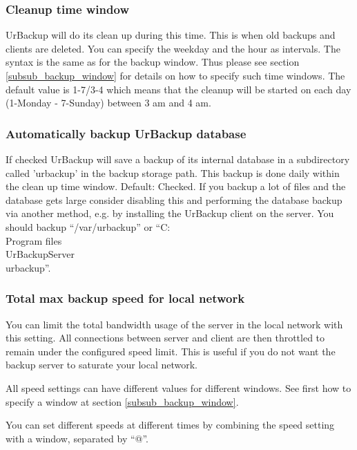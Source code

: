 \documentclass[a4paper,10pt]{article}
\begin{document}
\subsubsection{Cleanup time window}

UrBackup will do its clean up during this time. This is when old backups and
clients are deleted. You can specify the weekday and the hour as intervals. The
syntax is the same as for the backup window. Thus please see section
\ref{subsub_backup_window} for details on how to specify such time windows.
The default value is 1-7/3-4 which means that the cleanup will be started on
each day (1-Monday - 7-Sunday) between 3 am and 4 am.

\subsubsection{Automatically backup UrBackup database}

If checked UrBackup will save a backup of its internal database in a
subdirectory called 'urbackup' in the backup storage path. This backup is done
daily within the clean up time window. Default: Checked.
If you backup a lot of files and the database
gets large consider disabling this and performing the database backup via another method,
e.g. by installing the UrBackup client on the server. You should backup ``/var/urbackup''
or ``C:\\Program files\\UrBackupServer\\urbackup''.

\subsubsection{Total max backup speed for local network}

You can limit the total bandwidth usage of the server in the local network
with this setting. All connections between server and client are then throttled
to remain under the configured speed limit. This is useful if you do not want
the backup server to saturate your local network.

\label{speed_settings}
All speed settings can have different values for different windows. See first
how to specify a window at section \ref{subsub_backup_window}.

\par\null\par
You can set different speeds at different times by combining the speed setting with a window,
separated by ``@''.
\end{document}
